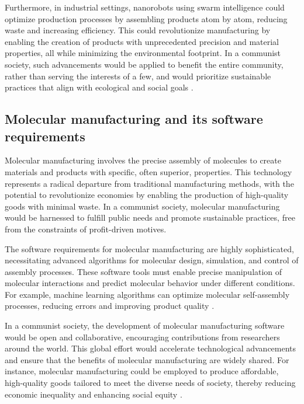 Furthermore, in industrial settings, nanorobots using swarm intelligence could optimize production processes by assembling products atom by atom, reducing waste and increasing efficiency. This could revolutionize manufacturing by enabling the creation of products with unprecedented precision and material properties, all while minimizing the environmental footprint. In a communist society, such advancements would be applied to benefit the entire community, rather than serving the interests of a few, and would prioritize sustainable practices that align with ecological and social goals \cite[pp.~90-95]{drexler1986engines}.

\subsection{Molecular manufacturing and its software requirements}

Molecular manufacturing involves the precise assembly of molecules to create materials and products with specific, often superior, properties. This technology represents a radical departure from traditional manufacturing methods, with the potential to revolutionize economies by enabling the production of high-quality goods with minimal waste. In a communist society, molecular manufacturing would be harnessed to fulfill public needs and promote sustainable practices, free from the constraints of profit-driven motives.

The software requirements for molecular manufacturing are highly sophisticated, necessitating advanced algorithms for molecular design, simulation, and control of assembly processes. These software tools must enable precise manipulation of molecular interactions and predict molecular behavior under different conditions. For example, machine learning algorithms can optimize molecular self-assembly processes, reducing errors and improving product quality \cite[pp.~215-220]{freitas2005nanomedicine}.

In a communist society, the development of molecular manufacturing software would be open and collaborative, encouraging contributions from researchers around the world. This global effort would accelerate technological advancements and ensure that the benefits of molecular manufacturing are widely shared. For instance, molecular manufacturing could be employed to produce affordable, high-quality goods tailored to meet the diverse needs of society, thereby reducing economic inequality and enhancing social equity \cite[pp.~98-105]{drexler1986engines}.

